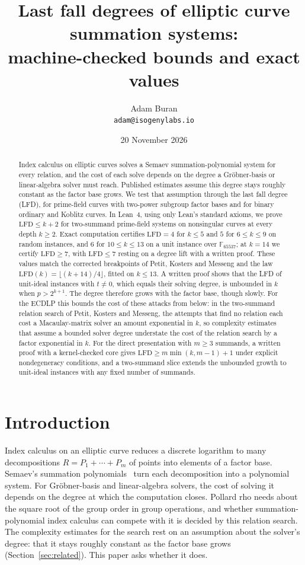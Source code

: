 \documentclass[11pt]{article}
\title{Last fall degrees of elliptic curve summation systems:\\ machine-checked bounds and exact values}
\author{Adam Buran\\ \texttt{adam@isogenylabs.io}}
\date{20 November 2026}
\theoremstyle{definition}\newtheorem{definition}[theorem]{Definition}
\theoremstyle{remark}\newtheorem{remark}[theorem]{Remark}
\begin{document}
\maketitle
\begin{abstract}
Index calculus on elliptic curves solves a Semaev summation-polynomial
system for every relation, and the cost of each solve depends on the degree
a Gr\"obner-basis or linear-algebra solver must reach. Published estimates
assume this degree stays roughly constant as the factor base grows. We test
that assumption through the last fall degree (LFD), for prime-field curves
with two-power subgroup factor bases and for binary ordinary and Koblitz
curves. In Lean~4, using only Lean's standard axioms, we prove
$\mathrm{LFD}\le k+2$ for two-summand prime-field systems on nonsingular
curves at every depth $k\ge2$. Exact computation certifies
$\mathrm{LFD}=4$ for $k\le5$ and $5$ for $6\le k\le9$ on random instances,
and $6$ for $10\le k\le13$ on a unit instance over $\mathbb{F}_{65537}$; at
$k=14$ we certify $\mathrm{LFD}\ge7$, with $\mathrm{LFD}\le7$ resting on a
degree lift with a written proof. These values match the corrected
breakpoints of Petit, Kosters and Messeng and the law
$\mathrm{LFD}(k)=\lfloor(k+14)/4\rfloor$, fitted on $k\le13$. A written
proof shows that the LFD of unit-ideal instances with $t\ne0$, which equals
their solving degree, is unbounded in $k$ when $p>2^{k+1}$. The degree
therefore grows with the factor base, though slowly. For the ECDLP this
bounds the cost of these attacks from below: in the two-summand relation
search of Petit, Kosters and Messeng, the attempts that find no relation
each cost a Macaulay-matrix solver an amount exponential in $k$, so
complexity estimates that assume a bounded solver degree understate the
cost of the relation search by a factor exponential in $k$. For the direct
presentation with $m\ge3$ summands, a written proof with a kernel-checked
core gives $\mathrm{LFD}\ge m\min(k,m-1)+1$ under explicit nondegeneracy
conditions, and a two-summand slice extends the unbounded growth to
unit-ideal instances with any fixed number of summands.
\end{abstract}

\section{Introduction}\label{sec:intro}
Index calculus on an elliptic curve reduces a discrete logarithm to many
decompositions $R=P_1+\cdots+P_m$ of points into elements of a factor base.
Semaev's summation polynomials~\cite{semaev} turn each decomposition into a
polynomial system. For Gr\"obner-basis and linear-algebra solvers, the cost
of solving it depends on the degree at which the computation closes.
Pollard rho needs about the square root of the group order in group
operations, and whether summation-polynomial index calculus can compete
with it is decided by this relation search. The complexity estimates for
the search rest on an assumption about the solver's degree: that it stays
roughly constant as the factor base grows (Section~\ref{sec:related}). This
paper asks whether it does.
\end{document}

